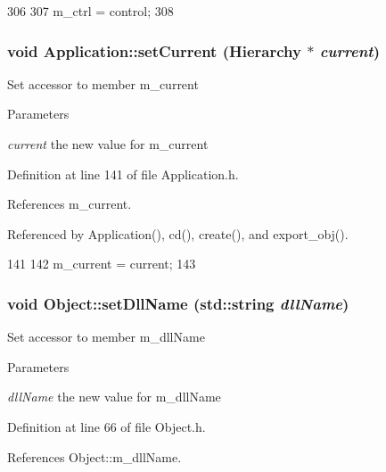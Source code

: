 \begin{DoxyCode}
306                                    {
307     m_ctrl = control;
308   }
\end{DoxyCode}
\hypertarget{classApplication_a0f0a9e376d9f1716e01e86c94ae3499f}{
\subsubsection[{setCurrent}]{\setlength{\rightskip}{0pt plus 5cm}void Application::setCurrent ({\bf Hierarchy} $\ast$ {\em current})}}
\label{classApplication_a0f0a9e376d9f1716e01e86c94ae3499f}
Set accessor to member m\_\-current 
\begin{DoxyParams}{Parameters}
\item[{\em current}]the new value for m\_\-current \end{DoxyParams}


Definition at line 141 of file Application.h.

References m\_\-current.

Referenced by Application(), cd(), create(), and export\_\-obj().


\begin{DoxyCode}
141                                        {
142     m_current = current;
143   }
\end{DoxyCode}
\hypertarget{classObject_a870c5af919958c2136623b2d7816d123}{
\subsubsection[{setDllName}]{\setlength{\rightskip}{0pt plus 5cm}void Object::setDllName (std::string {\em dllName})}}
\label{classObject_a870c5af919958c2136623b2d7816d123}
Set accessor to member m\_\-dllName 
\begin{DoxyParams}{Parameters}
\item[{\em dllName}]the new value for m\_\-dllName \end{DoxyParams}


Definition at line 66 of file Object.h.

References Object::m\_\-dllName.

